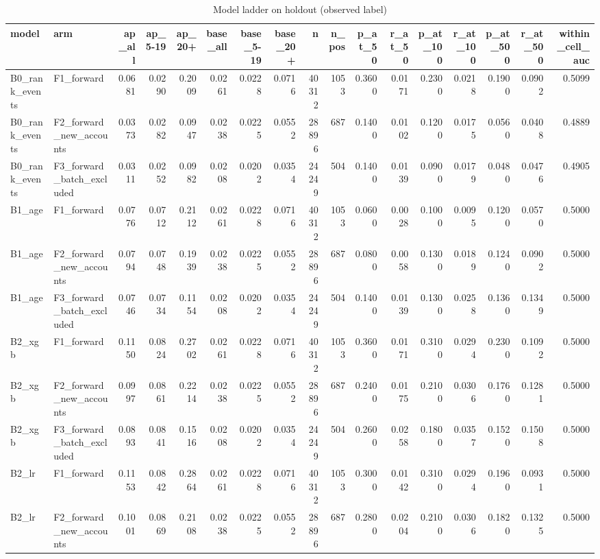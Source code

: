 \begin{table}
\caption{Model ladder on holdout (observed label)}
\label{tab:tab_models_by_stratum_final}
\begin{tabular}{llrrrrrrrrrrrrrrr}
\toprule
model & arm & ap\_all & ap\_5-19 & ap\_20+ & base\_all & base\_5-19 & base\_20+ & n & n\_pos & p\_at\_50 & r\_at\_50 & p\_at\_100 & r\_at\_100 & p\_at\_500 & r\_at\_500 & within\_cell\_auc \\
\midrule
B0\_rank\_events & F1\_forward & 0.0681 & 0.0290 & 0.2009 & 0.0261 & 0.0228 & 0.0716 & 40312 & 1053 & 0.3600 & 0.0171 & 0.2300 & 0.0218 & 0.1900 & 0.0902 & 0.5099 \\
B0\_rank\_events & F2\_forward\_new\_accounts & 0.0373 & 0.0282 & 0.0947 & 0.0238 & 0.0225 & 0.0552 & 28896 & 687 & 0.1400 & 0.0102 & 0.1200 & 0.0175 & 0.0560 & 0.0408 & 0.4889 \\
B0\_rank\_events & F3\_forward\_batch\_excluded & 0.0311 & 0.0252 & 0.0982 & 0.0208 & 0.0202 & 0.0354 & 24249 & 504 & 0.1400 & 0.0139 & 0.0900 & 0.0179 & 0.0480 & 0.0476 & 0.4905 \\
B1\_age & F1\_forward & 0.0776 & 0.0712 & 0.2112 & 0.0261 & 0.0228 & 0.0716 & 40312 & 1053 & 0.0600 & 0.0028 & 0.1000 & 0.0095 & 0.1200 & 0.0570 & 0.5000 \\
B1\_age & F2\_forward\_new\_accounts & 0.0794 & 0.0748 & 0.1939 & 0.0238 & 0.0225 & 0.0552 & 28896 & 687 & 0.0800 & 0.0058 & 0.1300 & 0.0189 & 0.1240 & 0.0902 & 0.5000 \\
B1\_age & F3\_forward\_batch\_excluded & 0.0746 & 0.0734 & 0.1154 & 0.0208 & 0.0202 & 0.0354 & 24249 & 504 & 0.1400 & 0.0139 & 0.1300 & 0.0258 & 0.1360 & 0.1349 & 0.5000 \\
B2\_xgb & F1\_forward & 0.1150 & 0.0824 & 0.2702 & 0.0261 & 0.0228 & 0.0716 & 40312 & 1053 & 0.3600 & 0.0171 & 0.3100 & 0.0294 & 0.2300 & 0.1092 & 0.5000 \\
B2\_xgb & F2\_forward\_new\_accounts & 0.0997 & 0.0861 & 0.2214 & 0.0238 & 0.0225 & 0.0552 & 28896 & 687 & 0.2400 & 0.0175 & 0.2100 & 0.0306 & 0.1760 & 0.1281 & 0.5000 \\
B2\_xgb & F3\_forward\_batch\_excluded & 0.0893 & 0.0841 & 0.1516 & 0.0208 & 0.0202 & 0.0354 & 24249 & 504 & 0.2600 & 0.0258 & 0.1800 & 0.0357 & 0.1520 & 0.1508 & 0.5000 \\
B2\_lr & F1\_forward & 0.1153 & 0.0842 & 0.2864 & 0.0261 & 0.0228 & 0.0716 & 40312 & 1053 & 0.3000 & 0.0142 & 0.3100 & 0.0294 & 0.1960 & 0.0931 & 0.5000 \\
B2\_lr & F2\_forward\_new\_accounts & 0.1001 & 0.0869 & 0.2108 & 0.0238 & 0.0225 & 0.0552 & 28896 & 687 & 0.2800 & 0.0204 & 0.2100 & 0.0306 & 0.1820 & 0.1325 & 0.5000 \\

\end{tabular}
\end{table}

